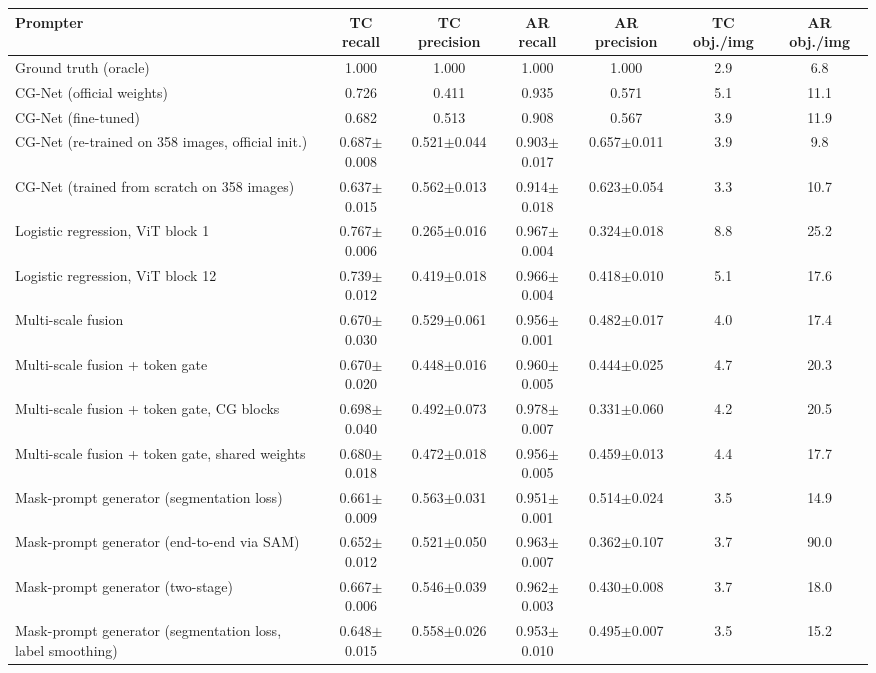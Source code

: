 \begin{table}[htbp]
\centering
\small
\begin{adjustbox}{max width=\linewidth}
\begin{tabular}{lcccccc}
\toprule
Prompter & TC recall & TC precision & AR recall & AR precision & TC obj./img & AR obj./img \\
\midrule
Ground truth (oracle) & 1.000 & 1.000 & 1.000 & 1.000 & 2.9 & 6.8 \\
CG-Net (official weights) & 0.726 & 0.411 & 0.935 & 0.571 & 5.1 & 11.1 \\
CG-Net (fine-tuned) & 0.682 & 0.513 & 0.908 & 0.567 & 3.9 & 11.9 \\
CG-Net (re-trained on 358 images, official init.) & 0.687$\pm$0.008 & 0.521$\pm$0.044 & 0.903$\pm$0.017 & 0.657$\pm$0.011 & 3.9 & 9.8 \\
CG-Net (trained from scratch on 358 images) & 0.637$\pm$0.015 & 0.562$\pm$0.013 & 0.914$\pm$0.018 & 0.623$\pm$0.054 & 3.3 & 10.7 \\
Logistic regression, ViT block 1 & 0.767$\pm$0.006 & 0.265$\pm$0.016 & 0.967$\pm$0.004 & 0.324$\pm$0.018 & 8.8 & 25.2 \\
Logistic regression, ViT block 12 & 0.739$\pm$0.012 & 0.419$\pm$0.018 & 0.966$\pm$0.004 & 0.418$\pm$0.010 & 5.1 & 17.6 \\
Multi-scale fusion & 0.670$\pm$0.030 & 0.529$\pm$0.061 & 0.956$\pm$0.001 & 0.482$\pm$0.017 & 4.0 & 17.4 \\
Multi-scale fusion + token gate & 0.670$\pm$0.020 & 0.448$\pm$0.016 & 0.960$\pm$0.005 & 0.444$\pm$0.025 & 4.7 & 20.3 \\
Multi-scale fusion + token gate, CG blocks & 0.698$\pm$0.040 & 0.492$\pm$0.073 & 0.978$\pm$0.007 & 0.331$\pm$0.060 & 4.2 & 20.5 \\
Multi-scale fusion + token gate, shared weights & 0.680$\pm$0.018 & 0.472$\pm$0.018 & 0.956$\pm$0.005 & 0.459$\pm$0.013 & 4.4 & 17.7 \\
Mask-prompt generator (segmentation loss) & 0.661$\pm$0.009 & 0.563$\pm$0.031 & 0.951$\pm$0.001 & 0.514$\pm$0.024 & 3.5 & 14.9 \\
Mask-prompt generator (end-to-end via SAM) & 0.652$\pm$0.012 & 0.521$\pm$0.050 & 0.963$\pm$0.007 & 0.362$\pm$0.107 & 3.7 & 90.0 \\
Mask-prompt generator (two-stage) & 0.667$\pm$0.006 & 0.546$\pm$0.039 & 0.962$\pm$0.003 & 0.430$\pm$0.008 & 3.7 & 18.0 \\
Mask-prompt generator (segmentation loss, label smoothing) & 0.648$\pm$0.015 & 0.558$\pm$0.026 & 0.953$\pm$0.010 & 0.495$\pm$0.007 & 3.5 & 15.2 \\

\end{tabular}
\end{adjustbox}
\end{table}
